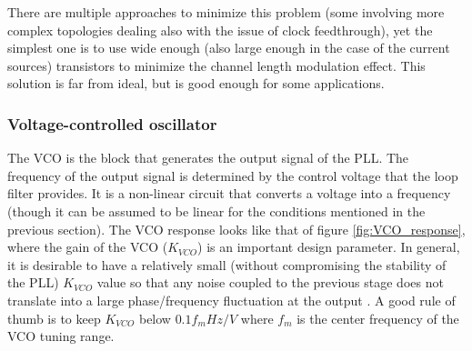 \noindent There are multiple approaches to minimize this problem (some involving more complex topologies dealing also with the issue of clock feedthrough), yet 
the simplest one is to use wide enough (also large enough in the case of the current sources) transistors to minimize the channel length 
modulation effect. This solution is far from ideal, but is good enough for some applications.

\subsubsection{Voltage-controlled oscillator}
The VCO is the block that generates the output signal of the PLL. The frequency of the output signal is determined by the control voltage
that the loop filter provides. It is a non-linear circuit that converts a voltage into a frequency (though it can be assumed to be linear 
for the conditions mentioned in the previous section). The VCO response looks like that of figure \ref{fig:VCO_response}, where the gain 
of the VCO ($K_{VCO}$) is an important design parameter. In general, it is desirable to have a relatively small (without compromising the 
stability of the PLL) $K_{VCO}$ value so that any noise coupled to the previous stage does not translate into a large phase/frequency 
fluctuation at the output \cite{Razavi_PLL_book}. A good rule of thumb is to keep $K_{VCO}$ below $0.1 f_m Hz/V$ where $f_m$ is the center frequency of the VCO
tuning range.


